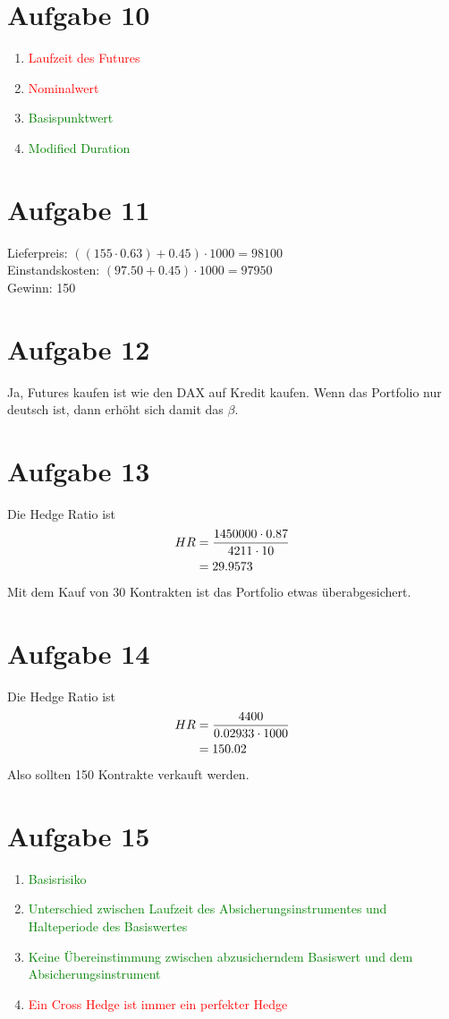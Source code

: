 \documentclass{article}
\begin{document}
	\section*{Aufgabe 10}
	\begin{enumerate}[label=(\alph*)]
		\item\textcolor{red}{Laufzeit des Futures}
		\item\textcolor{red}{Nominalwert}
		\item\textcolor{green}{Basispunktwert}
		\item\textcolor{green}{Modified Duration}
	\end{enumerate}
	
	\section*{Aufgabe 11}
	Lieferpreis: $((155\cdot 0.63) + 0.45)\cdot 1000 = 98100$ \\
	Einstandskosten: $(97.50 + 0.45)\cdot 1000 = 97950$ \\
	Gewinn: 150
	
	\section*{Aufgabe 12}
	Ja, Futures kaufen ist wie den DAX auf Kredit kaufen. Wenn das Portfolio nur deutsch ist, dann erhöht sich damit das $\beta$.
	
	\section*{Aufgabe 13}
	Die Hedge Ratio ist
	\begin{align}
		HR &= \frac{1450000\cdot 0.87}{4211\cdot 10} \notag \\
		&= 29.9573 \notag
	\end{align}
	Mit dem Kauf von 30 Kontrakten ist das Portfolio etwas überabgesichert.
	
	\section*{Aufgabe 14}
	Die Hedge Ratio ist
	\begin{align}
		HR &= \frac{4400}{0.02933\cdot 1000} \notag \\
		&= 150.02 \notag
	\end{align}
	Also sollten 150 Kontrakte verkauft werden.
	
	\section*{Aufgabe 15}
	\begin{enumerate}[label=(\alph*)]
		\item\textcolor{green}{Basisrisiko}
		\item\textcolor{green}{Unterschied zwischen Laufzeit des Absicherungsinstrumentes und Halteperiode des Basiswertes}
		\item\textcolor{green}{Keine Übereinstimmung zwischen abzusicherndem Basiswert und dem Absicherungsinstrument}
		\item\textcolor{red}{Ein Cross Hedge ist immer ein perfekter Hedge}
	\end{enumerate}
\end{document}
